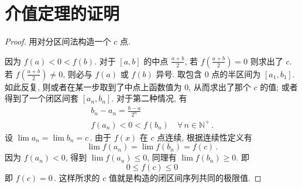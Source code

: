 \documentclass{book}
\newcommand{\Any}{\forall\,}
\newcommand{\N}{\mathbb{N}}
\renewcommand{\ge}{\geqslant}
\renewcommand{\le}{\leqslant}
\numberwithin{equation}{section}
\numberwithin{figure}{section}
\theoremstyle{definition}
\begin{document}
\section{介值定理的证明}
\hypertarget{the:Intermediate_value_theorem}{}
\begin{proof}
  用对分区间法构造一个 $c$ 点.

  因为 $f(a)<0<f(b)$. 对于 $[a,b]$ 的中点 $\frac{a+b}{2}$, 若 $f\left( \frac{a+b}{2} \right)=0$ 则求出了 $c$. 若 $f\left( \frac{a+b}{2} \right)\ne 0$, 则必与 $f(a)$ 或 $f(b)$ 异号. 取包含 $0$ 点的半区间为 $[a_1,b_1]$. 如此反复, 则或者在某一步取到了中点上函数值为 $0$, 从而求出了那个 $c$ 的值; 或者得到了一个闭区间套 ${[a_n,b_n]}$. 对于第二种情况, 有
  \begin{gather*}
    b_n-a_n=\frac{b-a}{2^n}\\
    f(a_n)<0<f(b_n)\quad \Any n\in\N^+\,.
  \end{gather*}
  设 $\lim a_n=\lim b_n=c\,$.
  由于 $f(x)$ 在 $c$ 点连续, 根据连续性定义有
  \begin{equation*}
    \lim f(a_n)=\lim f(b_n)=f(c)\,.
  \end{equation*}
  因为 $f(a_n)<0$, 得到 $\lim f(a_n)\le0$, 同理有 $\lim f(b_n)\ge0$.
  即 
  \begin{equation*}
    0\le f(c)\le 0
  \end{equation*}
  即 $f(c)=0$\,.
  这样所求的 $c$ 值就是构造的闭区间序列共同的极限值.
\end{proof}
\end{document}
